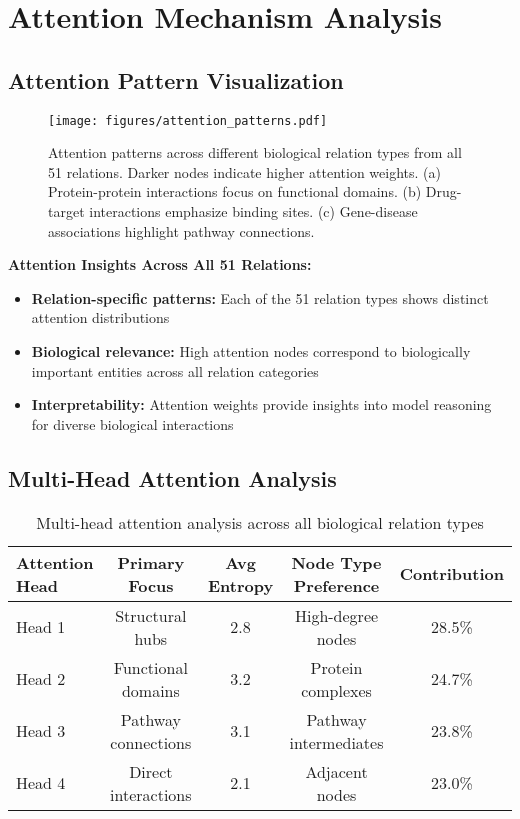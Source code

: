 \section{Attention Mechanism Analysis}
\label{app:attention}

\subsection{Attention Pattern Visualization}

\begin{figure}[h]
\centering
\texttt{[image: figures/attention\_patterns.pdf]}
\caption{Attention patterns across different biological relation types from all 51 relations. Darker nodes indicate higher attention weights. (a) Protein-protein interactions focus on functional domains. (b) Drug-target interactions emphasize binding sites. (c) Gene-disease associations highlight pathway connections.}
\label{fig:attention_patterns}
\end{figure}

\textbf{Attention Insights Across All 51 Relations:}
\begin{itemize}
\item \textbf{Relation-specific patterns:} Each of the 51 relation types shows distinct attention distributions
\item \textbf{Biological relevance:} High attention nodes correspond to biologically important entities across all relation categories
\item \textbf{Interpretability:} Attention weights provide insights into model reasoning for diverse biological interactions
\end{itemize}

\subsection{Multi-Head Attention Analysis}

\begin{table}[h]
\centering
\caption{Multi-head attention analysis across all biological relation types}
\label{tab:attention_heads}
\begin{tabular}{lcccc}
\toprule
\textbf{Attention Head} & \textbf{Primary Focus} & \textbf{Avg Entropy} & \textbf{Node Type Preference} & \textbf{Contribution} \\
\midrule
Head 1 & Structural hubs & 2.8 & High-degree nodes & 28.5\% \\
Head 2 & Functional domains & 3.2 & Protein complexes & 24.7\% \\
Head 3 & Pathway connections & 3.1 & Pathway intermediates & 23.8\% \\
Head 4 & Direct interactions & 2.1 & Adjacent nodes & 23.0\% \\
\bottomrule
\end{tabular}
\end{table}

